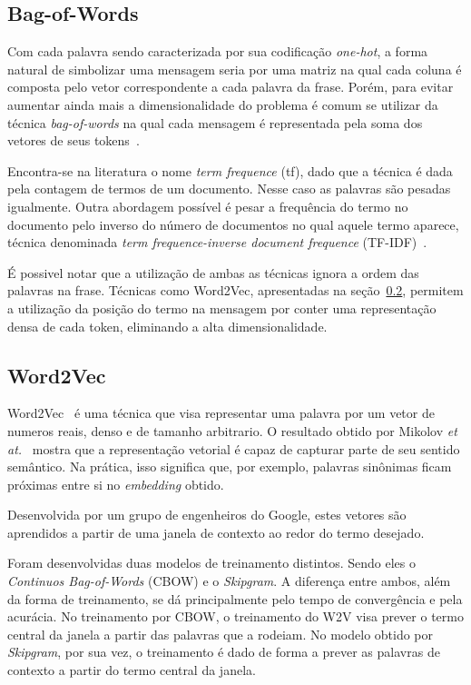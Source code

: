 \subsection{Bag-of-Words}

Com cada palavra sendo caracterizada por sua codificação \textit{one-hot}, a forma natural de simbolizar uma mensagem
seria por uma matriz na qual cada coluna é composta pelo vetor correspondente a cada palavra da frase.
Porém, para evitar aumentar ainda mais a dimensionalidade do problema é comum se utilizar da técnica \textit{bag-of-words}
na qual cada mensagem é representada pela soma dos vetores de seus tokens~\cite{schutze08}.

Encontra-se na literatura o nome \textit{term frequence} (tf), dado que a técnica é dada pela contagem de termos de um
documento.
Nesse caso as palavras são pesadas igualmente.
Outra abordagem possível é pesar a frequência do termo no documento pelo inverso do número de documentos no qual aquele
termo aparece, técnica denominada \textit{term frequence-inverse document frequence} (TF-IDF)~\cite{salton88}.

É possivel notar que a utilização de ambas as técnicas ignora a ordem das palavras na frase.
Técnicas como Word2Vec, apresentadas na seção~\ref{w2v}, permitem a utilização da posição do termo na mensagem por conter
uma representação densa de cada token, eliminando a alta dimensionalidade.

\subsection{Word2Vec}\label{w2v}

Word2Vec~\cite{mikolov13} é uma técnica que visa representar uma palavra por um vetor de numeros reais, denso e de
tamanho arbitrario.
O resultado obtido por Mikolov \textit{et at.}~\cite{mikolov13} mostra que a representação vetorial é capaz de capturar
parte de seu sentido semântico.
Na prática, isso significa que, por exemplo, palavras sinônimas ficam próximas entre si no \textit{embedding} obtido.

Desenvolvida por um grupo de engenheiros do Google, estes vetores são aprendidos a partir de uma janela de contexto
ao redor do termo desejado.

Foram desenvolvidas duas modelos de treinamento distintos.
Sendo eles o \textit{Continuos Bag-of-Words} (CBOW) e o \textit{Skipgram}.
A diferença entre ambos, além da forma de treinamento, se dá principalmente pelo tempo de convergência e pela acurácia.
No treinamento por CBOW, o treinamento do W2V visa prever o termo central da janela a partir das palavras que a rodeiam.
No modelo obtido por \textit{Skipgram}, por sua vez, o treinamento é dado de forma a prever as palavras de contexto a
partir do termo central da janela.

